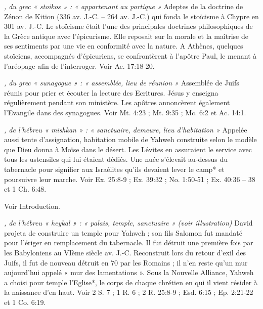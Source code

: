 \begin{multicols}{2}
{\textit{, du grec « stoikos » : « appartenant au portique »}\newline
Adeptes de la doctrine de Zénon de Kition (336 av. J.-C. – 264 av. J.-C.) qui fonda le stoïcisme à Chypre en 301 av. J.-C. Le stoïcisme était l'une des principales doctrines philosophiques de la Grèce antique avec l'épicurisme. Elle reposait sur la morale et la maîtrise de ses sentiments par une vie en conformité avec la nature. A Athènes, quelques stoïciens, accompagnés d'épicuriens, se confrontèrent à l'apôtre Paul, le menant à l'aréopage afin de l'interroger. Voir Ac. 17:18-20.

\textit{, du grec « sunagogue » : « assemblée, lieu de réunion »}\newline
Assemblée de Juifs réunis pour prier et écouter la lecture des Ecritures. Jésus y enseigna régulièrement pendant son ministère. Les apôtres annoncèrent également l'Evangile dans des synagogues. Voir Mt. 4:23 ; Mt. 9:35 ; Mc. 6:2 et Ac. 14:1.

\textit{, de l'hébreu « mishkan » : « sanctuaire, demeure, lieu d'habitation »}\newline
Appelée aussi tente d'assignation, habitation mobile de Yahweh construite selon le modèle que Dieu donna à Moïse dans le désert. Les Lévites en assuraient le service avec tous les ustensiles qui lui étaient dédiés. Une nuée s'élevait au-dessus du tabernacle pour signifier aux Israélites qu'ils devaient lever le camp* et poursuivre leur marche. Voir Ex. 25:8-9 ; Ex. 39:32 ; No. 1:50-51 ; Ex. 40:36 – 38 et 1 Ch. 6:48.

\textit{}\newline
Voir Introduction.

\textit{, de l'hébreu « heykal » : « palais, temple, sanctuaire » (voir illustration)}\newline
David projeta de construire un temple pour Yahweh ; son fils Salomon fut mandaté pour l'ériger en remplacement du tabernacle. Il fut détruit une première fois par les Babyloniens au VIème siècle av. J.-C. Reconstruit lors du retour d'exil des Juifs, il fut de nouveau détruit en 70 par les Romains ; il n'en reste qu'un mur aujourd'hui appelé « mur des lamentations ». Sous la Nouvelle Alliance, Yahweh a choisi pour temple l'Eglise*, le corps de chaque chrétien en qui il vient résider à la naissance d'en haut. Voir 2 S. 7 ; 1 R. 6 ; 2 R. 25:8-9 ; Esd. 6:15 ; Ep. 2:21-22 et 1 Co. 6:19.

}
\end{multicols}
